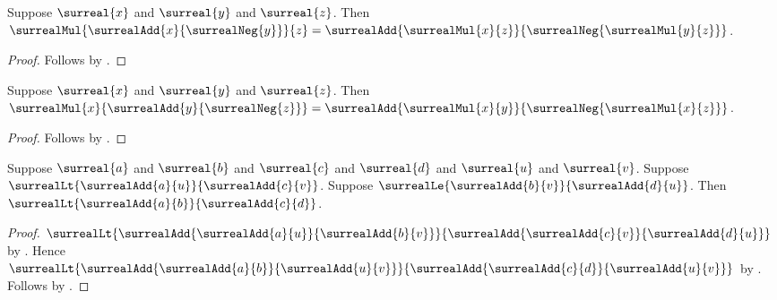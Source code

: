 \begin{corollary}\label{surreal_mul_subtract_left}
    Suppose $\surreal{x}$ and $\surreal{y}$ and $\surreal{z}$.
    Then $\surrealMul{\surrealAdd{x}{\surrealNeg{y}}}{z}
        =\surrealAdd{\surrealMul{x}{z}}
            {\surrealNeg{\surrealMul{y}{z}}}$.
\end{corollary}
\begin{proof}
    Follows by
        .
\end{proof}

\begin{corollary}\label{surreal_mul_subtract_right}
    Suppose $\surreal{x}$ and $\surreal{y}$ and $\surreal{z}$.
    Then $\surrealMul{x}{\surrealAdd{y}{\surrealNeg{z}}}
        =\surrealAdd{\surrealMul{x}{y}}
            {\surrealNeg{\surrealMul{x}{z}}}$.
\end{corollary}
\begin{proof}
    Follows by
        .
\end{proof}

\begin{lemma}\label{surreal_add_cross_cancel_lt_le}
    Suppose $\surreal{a}$ and $\surreal{b}$ and $\surreal{c}$ and
        $\surreal{d}$ and $\surreal{u}$ and $\surreal{v}$.
    Suppose $\surrealLt{\surrealAdd{a}{u}}{\surrealAdd{c}{v}}$.
    Suppose $\surrealLe{\surrealAdd{b}{v}}{\surrealAdd{d}{u}}$.
    Then $\surrealLt{\surrealAdd{a}{b}}{\surrealAdd{c}{d}}$.
\end{lemma}
\begin{proof}
    $\surrealLt
        {\surrealAdd{\surrealAdd{a}{u}}{\surrealAdd{b}{v}}}
        {\surrealAdd{\surrealAdd{c}{v}}{\surrealAdd{d}{u}}}$
        by .
    Hence $\surrealLt
        {\surrealAdd{\surrealAdd{a}{b}}{\surrealAdd{u}{v}}}
        {\surrealAdd{\surrealAdd{c}{d}}{\surrealAdd{u}{v}}}$
        by
        .
    Follows by
        .
\end{proof}


